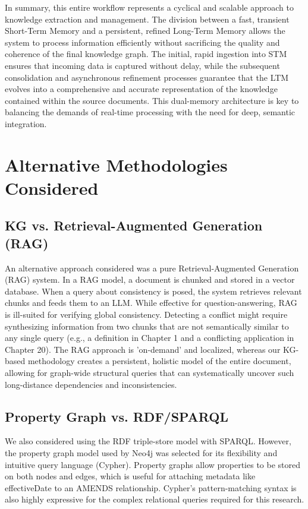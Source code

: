 In summary, this entire workflow represents a cyclical and scalable approach to knowledge extraction and management. The division between a fast, transient Short-Term Memory and a persistent, refined Long-Term Memory allows the system to process information efficiently without sacrificing the quality and coherence of the final knowledge graph. The initial, rapid ingestion into STM ensures that incoming data is captured without delay, while the subsequent consolidation and asynchronous refinement processes guarantee that the LTM evolves into a comprehensive and accurate representation of the knowledge contained within the source documents. This dual-memory architecture is key to balancing the demands of real-time processing with the need for deep, semantic integration.

\section{Alternative Methodologies Considered}

\subsection{KG vs. Retrieval-Augmented Generation (RAG)}
An alternative approach considered was a pure Retrieval-Augmented Generation (RAG) system. In a RAG model, a document is chunked and stored in a vector database. When a query about consistency is posed, the system retrieves relevant chunks and feeds them to an LLM. While effective for question-answering, RAG is ill-suited for verifying global consistency. Detecting a conflict might require synthesizing information from two chunks that are not semantically similar to any single query (e.g., a definition in Chapter 1 and a conflicting application in Chapter 20). The RAG approach is 'on-demand' and localized, whereas our KG-based methodology creates a persistent, holistic model of the entire document, allowing for graph-wide structural queries that can systematically uncover such long-distance dependencies and inconsistencies.

\subsection{Property Graph vs. RDF/SPARQL}
We also considered using the RDF triple-store model with SPARQL. However, the property graph model used by Neo4j was selected for its flexibility and intuitive query language (Cypher). Property graphs allow properties to be stored on both nodes and edges, which is useful for attaching metadata like effectiveDate to an AMENDS relationship. Cypher's pattern-matching syntax is also highly expressive for the complex relational queries required for this research.

